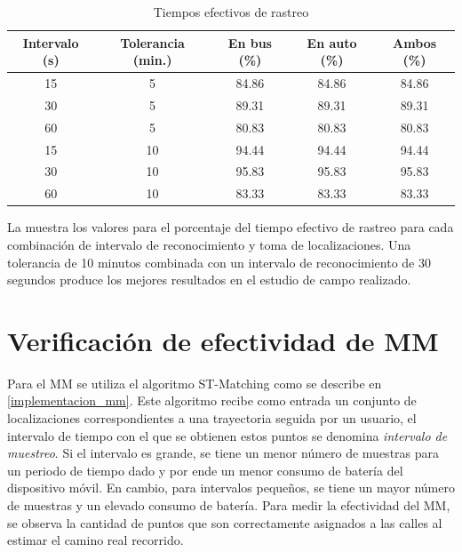 \begin{table}[h]
    \centering
	\begin{tabular}{ccccc}
    	\toprule
    	Intervalo (s) & Tolerancia (min.) & En bus (\%) & En auto (\%) & Ambos (\%) \\
    	\midrule
    	15            & 5                 & 84.86         & 84.86          & 84.86        \\
    	30            & 5                 & 89.31         & 89.31          & 89.31        \\
    	60            & 5                 & 80.83         & 80.83          & 80.83        \\
    	15            & 10                & 94.44         & 94.44          & 94.44        \\
    	30            & 10                & 95.83         & 95.83          & 95.83        \\
    	60            & 10                & 83.33         & 83.33          & 83.33        \\
    	\bottomrule
	\end{tabular}
    \caption{Tiempos efectivos de rastreo}
    \label{tab:prom_tiempo_efectivo_rastreo}
\end{table}

La  muestra los valores para el porcentaje del tiempo efectivo de rastreo para cada combinación de intervalo de reconocimiento y toma de localizaciones. Una tolerancia de 10 minutos combinada con un intervalo de reconocimiento de 30 segundos produce los mejores resultados en el estudio de campo realizado.

\section{Verificación de efectividad de MM}

Para el MM se utiliza el algoritmo ST-Matching como se describe en \cref{implementacion_mm}. Este algoritmo recibe como entrada un conjunto de localizaciones correspondientes a una trayectoria seguida por un usuario, el intervalo de tiempo con el que se obtienen estos puntos se denomina \emph{intervalo de muestreo}. Si el intervalo es grande, se tiene un menor número de muestras para un periodo de tiempo dado y por ende un menor consumo de batería del dispositivo móvil. En cambio, para intervalos pequeños, se tiene un mayor número de muestras y un elevado consumo de batería. Para medir la efectividad del MM, se observa la cantidad de puntos que son correctamente asignados a las calles al estimar el camino real recorrido.

